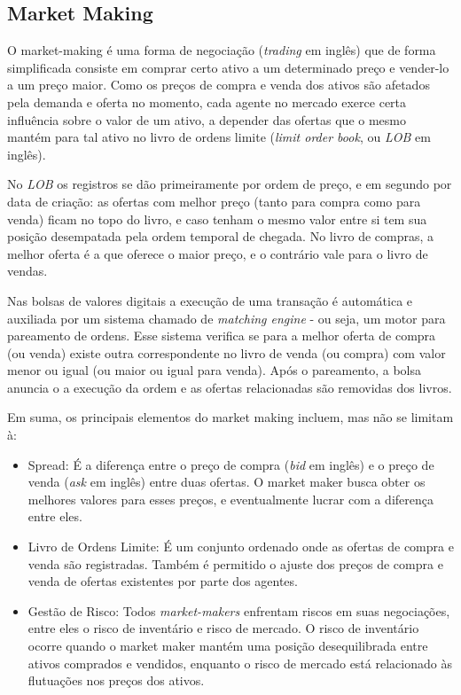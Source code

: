 \subsection{Market Making}
O market-making é uma forma de negociação (\textit{trading} em inglês) que de forma simplificada consiste em comprar certo ativo a um determinado preço e vender-lo a um preço maior.
Como os preços de compra e venda dos ativos são afetados pela demanda e oferta no momento, cada agente no mercado exerce certa influência sobre o valor de um ativo, a depender das ofertas que o mesmo mantém para tal ativo no livro de ordens limite (\textit{limit order book}, ou \textit{LOB} em inglês). 

No \textit{LOB} os registros se dão primeiramente por ordem de preço, e em segundo por data de criação: as ofertas com melhor preço (tanto para compra como para venda) ficam no topo do livro, e caso tenham o mesmo valor entre si tem sua posição desempatada pela ordem temporal de chegada. No livro de compras, a melhor oferta é a que oferece o maior preço, e o contrário vale para o livro de vendas.

Nas bolsas de valores digitais a execução de uma transação é automática e auxiliada por um sistema chamado de \textit{matching engine} - ou seja, um motor para pareamento de ordens. Esse sistema verifica se para a melhor oferta de compra (ou venda) existe outra correspondente no livro de venda (ou compra) com valor menor ou igual (ou maior ou igual para venda). Após o pareamento, a bolsa anuncia o a execução da ordem e as ofertas relacionadas são removidas dos livros.

Em suma, os principais elementos do market making incluem, mas não se limitam à:

\begin{itemize}
	\item Spread: É a diferença entre o preço de compra (\textit{bid} em inglês) e o preço de venda (\textit{ask} em inglês) entre duas ofertas. O market maker busca obter os melhores valores para esses preços, e eventualmente lucrar com a diferença entre eles.
	
	\item Livro de Ordens Limite: É um conjunto ordenado onde as ofertas de compra e venda são registradas. Também é permitido o ajuste dos preços de compra e venda de ofertas existentes por parte dos agentes.
	
	\item Gestão de Risco: Todos \textit{market-makers} enfrentam riscos em suas negociações, entre eles o risco de inventário e risco de mercado. O risco de inventário ocorre quando o market maker mantém uma posição desequilibrada entre ativos comprados e vendidos, enquanto o risco de mercado está relacionado às flutuações nos preços dos ativos.
\end{itemize}

